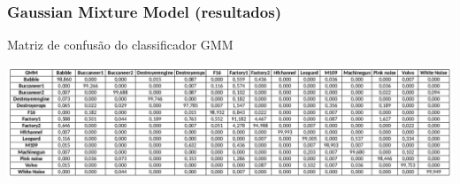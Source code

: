 \documentclass{beamer}
\begin{document}
\begin{frame}

	\frametitle{Gaussian Mixture Model (resultados)}
	
	\begin{table}[h]
		\centering
		\caption{Matriz de confusão do classificador GMM}
		\label{tab:confusion_gmm}
		\includegraphics[width=\textwidth]{conf_gmm.png}
	\end{table}
	
\end{frame}
\end{document}
